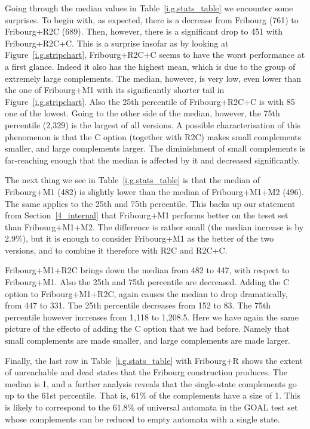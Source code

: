Going through the median values in Table~\ref{i.g.stats_table} we encounter some surprises. To begin with, as expected, there is a decrease from Fribourg (761) to Fribourg+R2C (689). Then, however, there is a significant drop to 451 with Fribourg+R2C+C. This is a surprise insofar as by looking at Figure~\ref{i.g.stripchart}, Fribourg+R2C+C seems to have the worst performance at a first glance. Indeed it also has the highest mean, which is due to the group of extremely large complements. The median, however, is very low, even lower than the one of Fribourg+M1 with its significantly shorter tail in Figure~\ref{i.g.stripchart}. Also the 25th percentile of Fribourg+R2C+C is with 85 one of the lowest. Going to the other side of the median, however, the 75th percentile (2,329) is the largest of all versions. A possible characterisation of this phenomenon is that the C option (together with R2C) makes small complements smaller, and large complements larger. The diminishment of small complements is far-reaching enough that the median is affected by it and decreased significantly.

The next thing we see in Table~\ref{i.g.stats_table} is that the median of Fribourg+M1 (482) is slightly lower than the median of Fribourg+M1+M2 (496). The same applies to the 25th and 75th percentile. This backs up our statement from Section~\ref{4_internal} that Fribourg+M1 performs better on the \goal{} teset set than Fribourg+M1+M2. The difference is rather small (the median increase is by 2.9\%), but it is enough to consider Fribourg+M1 as the better of the two versions, and to combine it therefore with R2C and R2C+C.

Fribourg+M1+R2C brings down the median from 482 to 447, with respect to Fribourg+M1. Also the 25th and 75th percentile are decreased. Adding the C option to Fribourg+M1+R2C, again causes the median to drop dramatically, from 447 to 331. The 25th percentile decreases from 152 to 83. The 75th percentile however increases from 1,118 to 1,208.5. Here we have again the same picture of the effecto of adding the C option that we had before. Namely that small complements are made smaller, and large complements are made larger.

Finally, the last row in Table~\ref{i.g.stats_table} with Fribourg+R shows the extent of unreachable and dead states that the Fribourg construction produces. The median is 1, and a further analysis reveals that the single-state complements go up to the 61st percentile. That is, 61\% of the complements have a size of 1. This is likely to correspond to the 61.8\% of universal automata in the GOAL test set whose complements can be reduced to empty automata with a single state.

